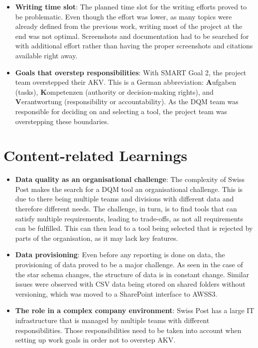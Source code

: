 \begin{itemize}
    \item \textbf{Writing time slot}: The planned time slot for the writing efforts proved to be problematic. Even though the effort was lower, as many topics were already defined from the previous work, writing most of the project at the end was not optimal. Screenshots and documentation had to be searched for with additional effort rather than having the proper screenshots and citations available right away.
    \item \textbf{Goals that overstep responsibilities}: With SMART Goal 2, the project team overstepped their \gls{AKV}. This is a German abbreviation: \textbf{A}ufgaben (tasks), \textbf{K}ompetenzen (authority or decision-making rights), and \textbf{V}erantwortung (responsibility or accountability). As the \gls{DQM} team was responsible for deciding on and selecting a tool, the project team was overstepping these boundaries.
\end{itemize}

\section{Content-related Learnings}

\begin{itemize}
    \item \textbf{Data quality as an organisational challenge}: The complexity of Swiss Post makes the search for a DQM tool an organisational challenge. This is due to there being multiple teams and divisions with different data and therefore different needs. The challenge, in turn, is to find tools that can satisfy multiple requirements, leading to trade-offs, as not all requirements can be fulfilled. This can then lead to a tool being selected that is rejected by parts of the organisation, as it may lack key features.

    \item \textbf{Data provisioning}: Even before any reporting is done on data, the provisioning of data proved to be a major challenge. As seen in the case of the star schema changes, the structure of data is in constant change. Similar issues were observed with CSV data being stored on shared folders without versioning, which was moved to a SharePoint interface to \gls{AWSS3}.
    \item \textbf{The role in a complex company environment}: Swiss Post has a large IT infrastructure that is managed by multiple teams with different responsibilities. Those responsibilities need to be taken into account when setting up work goals in order not to overstep \gls{AKV}.
\end{itemize}




